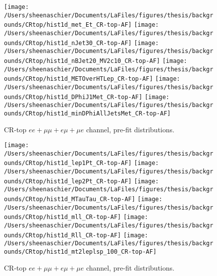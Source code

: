 \begin{figure}
    \centering
    \texttt{[image: /Users/sheenaschier/Documents/LaFiles/figures/thesis/backgrounds/CRtop/hist1d\_met\_Et\_CR-top-AF]}
    \texttt{[image: /Users/sheenaschier/Documents/LaFiles/figures/thesis/backgrounds/CRtop/hist1d\_nJet30\_CR-top-AF]}
    \texttt{[image: /Users/sheenaschier/Documents/LaFiles/figures/thesis/backgrounds/CRtop/hist1d\_nBJet20\_MV2c10\_CR-top-AF]}
    \texttt{[image: /Users/sheenaschier/Documents/LaFiles/figures/thesis/backgrounds/CRtop/hist1d\_METOverHTLep\_CR-top-AF]}
     \texttt{[image: /Users/sheenaschier/Documents/LaFiles/figures/thesis/backgrounds/CRtop/hist1d\_DPhiJ1Met\_CR-top-AF]}
     \texttt{[image: /Users/sheenaschier/Documents/LaFiles/figures/thesis/backgrounds/CRtop/hist1d\_minDPhiAllJetsMet\_CR-top-AF]}
        
    \caption{CR-top $ee+\mu\mu +e\mu + \mu e$ channel, pre-fit distributions.}
    \label{fig:CR-top-1}
\end{figure} 

\begin{figure}
    \centering
        \texttt{[image: /Users/sheenaschier/Documents/LaFiles/figures/thesis/backgrounds/CRtop/hist1d\_lep1Pt\_CR-top-AF]}
        \texttt{[image: /Users/sheenaschier/Documents/LaFiles/figures/thesis/backgrounds/CRtop/hist1d\_lep2Pt\_CR-top-AF]}
        \texttt{[image: /Users/sheenaschier/Documents/LaFiles/figures/thesis/backgrounds/CRtop/hist1d\_MTauTau\_CR-top-AF]}
        \texttt{[image: /Users/sheenaschier/Documents/LaFiles/figures/thesis/backgrounds/CRtop/hist1d\_mll\_CR-top-AF]}
        \texttt{[image: /Users/sheenaschier/Documents/LaFiles/figures/thesis/backgrounds/CRtop/hist1d\_Rll\_CR-top-AF]}
        \texttt{[image: /Users/sheenaschier/Documents/LaFiles/figures/thesis/backgrounds/CRtop/hist1d\_mt2leplsp\_100\_CR-top-AF]}
        
    \caption{CR-top $ee+\mu\mu +e\mu + \mu e$ channel, pre-fit distributions.}
    \label{fig:CR-top-2}
\end{figure}
\FloatBarrier
